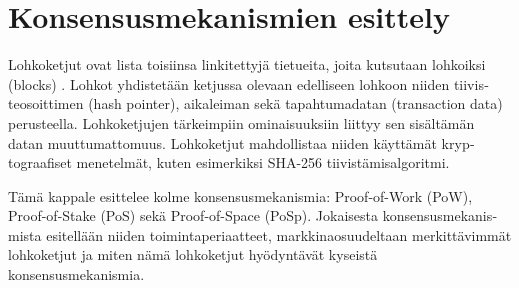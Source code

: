 \chapter{Konsensusmekanismien esittely\label{methods}}
\begin{otherlanguage}{english}

Lohkoketjut ovat lista toisiinsa linkitettyjä tietueita, joita kutsutaan lohkoiksi (blocks) \cite{blockchain1}. Lohkot yhdistetään ketjussa olevaan edelliseen lohkoon niiden tiivisteosoittimen (hash pointer), aikaleiman sekä tapahtumadatan (transaction data) perusteella. Lohkoketjujen tärkeimpiin ominaisuuksiin liittyy sen sisältämän datan muuttumattomuus. Lohkoketjut mahdollistaa niiden käyttämät kryptograafiset menetelmät, kuten esimerkiksi SHA-256 tiivistämisalgoritmi.

Tämä kappale esittelee kolme konsensusmekanismia: Proof-of-Work (PoW), Proof-of-Stake (PoS) sekä Proof-of-Space (PoSp). Jokaisesta konsensusmekanismista esitellään niiden toimintaperiaatteet, markkinaosuudeltaan merkittävimmät lohkoketjut ja miten nämä lohkoketjut hyödyntävät kyseistä konsensusmekanismia.





\end{otherlanguage}